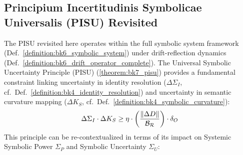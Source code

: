 \subsection{Principium Incertitudinis Symbolicae Universalis (PISU) Revisited}
\label{subsec:bk7_pisu_revisited_power_uncertainty}

The PISU revisited here operates within the full symbolic system framework (Def.~\ref{definition:bk6_symbolic_system}) under drift-reflection dynamics (Def.~\ref{definition:bk6_drift_operator_complete}).
The Universal Symbolic Uncertainty Principle (PISU) (\ref{theorem:bk7_pisu}) provides a fundamental constraint linking uncertainty in identity resolution (\(\Delta\Sigma_I\), cf.~Def.~\ref{definition:bk4_identity_resolution}) and uncertainty in semantic curvature mapping (\(\Delta K_S\), cf.~Def.~\ref{definition:bk4_symbolic_curvature}):
\[
\Delta\Sigma_I \cdot \Delta K_S \geq \eta \cdot \left(\frac{\|\Delta D\|}{\mathcal{B_R}}\right) \cdot \delta_O
\]
This principle can be re-contextualized in terms of its impact on Systemic Symbolic Power \(\Sigma_P\) and Symbolic Uncertainty \(\Sigma_U\):
